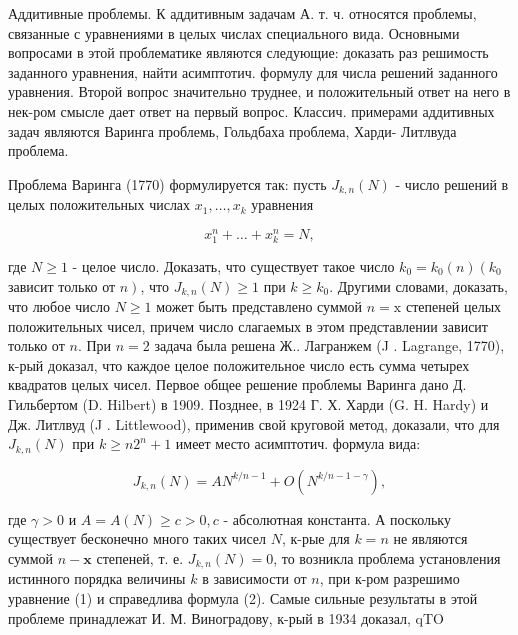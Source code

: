\documentclass[10pt]{article}
\begin{document}
Аддитивные проблемы. $К$ аддитивным задачам А. т. ч. относятся проблемы, связанные с уравнениями в целых числах специального вида. Основными вопросами в этой проблематике являются следующие: доказать раз решимость заданного уравнения, найти асимптотич. формулу для числа решений заданного уравнения. Второй вопрос значительно труднее, и положительный ответ на него в нек-ром смысле дает ответ на первый вопрос. Классич. примерами аддитивных задач являются Варинга проблемь, Гольдбаха проблема, Харди- Литлвуда проблема.



Проблема Варинга (1770) формулируется так: пусть $J_{k, n}(N)$ - число решений в целых положительных числах $x_{1}, \ldots, x_{k}$ уравнения



\[

x_{1}^{n}+\ldots+x_{k}^{n}=N,

\]



где $N \geqslant 1$ - целое число. Доказать, что существует такое число $k_{0}=k_{0}(n)\left(k_{0}\right.$ зависит только от $\left.n\right)$, что $J_{k, n}(N) \geqslant 1$ при $k \geqslant k_{0}$. Другими словами, доказать, что любое число $N \geqslant 1$ может быть представлено суммой $n=\mathrm{x}$ степеней целых положительных чисел, причем число слагаемых в этом представлении зависит только от $n$. При $n=2$ задача была решена Ж.. Лагранжем (J . Lagrange, 1770), к-рый доказал, что каждое целое положительное число есть сумма четырех квадратов целых чисел. Первое общее решение проблемы Варинга дано Д. Гильбертом (D. Hilbert) в 1909. Позднее, в 1924 Г. Х. Харди (G. H. Hardy) и Дж. Литлвуд (J . Littlewood), применив свой круговой метод, доказали, что для $J_{k, n}(N)$ при $k \geqslant n 2^{n}+1$ имеет место асимптотич. формула вида:



\[

J_{k, n}(N)=A N^{k / n-1}+O\left(N^{k / n-1-\gamma}\right),

\]



где $\gamma>0$ и $A=A(N) \geqslant c>0, c$ - абсолютная константа. А поскольку существует бесконечно много таких чисел $N$, к-рые для $k=n$ не являются суммой $n-\mathbf{x}$ степеней, т. е. $J_{k, n}(N)=0$, то возникла проблема установления истинного порядка величины $k$ в зависимости от $n$, при к-ром разрешимо уравнение (1) и справедлива формула (2). Самые сильные результаты в этой проблеме принадлежат И. М. Виноградову, к-рый в 1934 доказал, qTO
\end{document}
